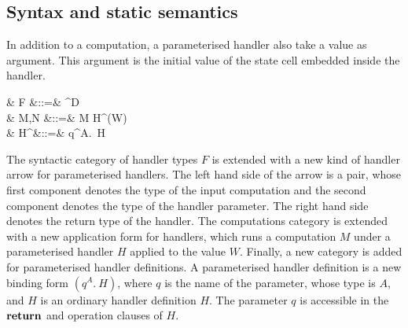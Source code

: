 \documentclass[12pt,phd,lfcs,twoside,openright,logo,leftchapter,normalheadings]{infthesis}
\theoremstyle{plain}
\theoremstyle{definition}
\begin{document}
\subsection{Syntax and static semantics}
In addition to a computation, a parameterised handler also take a
value as argument. This argument is the initial value of the state
cell embedded inside the handler.
%
\begin{syntax}
  & F &::=& \cdots \mid {} \Rightarrow^\param D\\
   & M,N        &::=& \cdots \mid \ParamHandle\; M \;\With\; H^\param(W)\\
   & H^\param   &::=& q^A.~H
\end{syntax}
%
The syntactic category of handler types $F$ is extended with a new
kind of handler arrow for parameterised handlers. The left hand side
of the arrow is a pair, whose first component denotes the type of the
input computation and the second component denotes the type of the
handler parameter. The right hand side denotes the return type of the
handler.
%
The computations category is extended with a new application form for
handlers, which runs a computation $M$ under a parameterised handler
$H$ applied to the value $W$.
%
Finally, a new category is added for parameterised handler
definitions. A parameterised handler definition is a new binding form
$(q^A.~H)$, where $q$ is the name of the parameter, whose type is $A$,
and $H$ is an ordinary handler definition $H$. The parameter $q$ is
accessible in the $\mathbf{return}$ and operation clauses of $H$.
\end{document}
